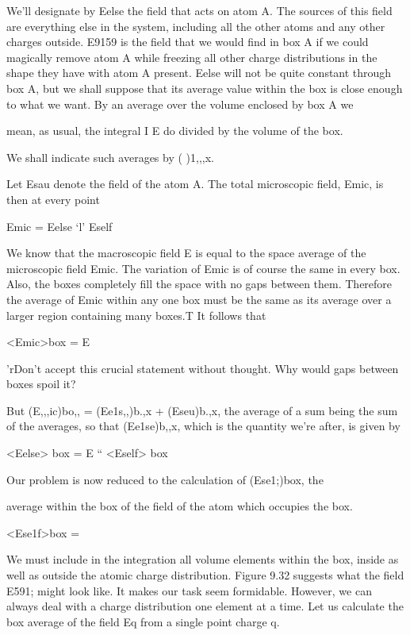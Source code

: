 {{We'll designate by Eelse the field that acts on atom A. The sources
of this field are everything else in the system, including all the other
atoms and any other charges outside. E9159 is the field that we would
find in box A if we could magically remove atom A while freezing all
other charge distributions in the shape they have with atom A
present. Eelse will not be quite constant through box A, but we shall
suppose that its average value within the box is close enough to what
we want. By an average over the volume enclosed by box A we

mean, as usual, the integral I E do divided by the volume of the box.

We shall indicate such averages by ( )1,,,x.

Let Esau denote the field of the atom A. The total microscopic
field, Emic, is then at every point

Emic = Eelse ‘l' Eself 

We know that the macroscopic field E is equal to the space average
of the microscopic field Emic. The variation of Emic is of course the
same in every box. Also, the boxes completely fill the space with
no gaps between them. Therefore the average of Emic within any
one box must be the same as its average over a larger region containing
many boxes.T It follows that

<Emic>box = E 

'rDon't accept this crucial statement without thought. Why would gaps between
boxes spoil it?

But (E,,,ic)bo,, = (Ee1s,,)b.,x + (Eseu)b.,x, the average of a sum being
the sum of the averages, so that (Ee1se)b,,x, which is the quantity we're
after, is given by

\begin{equation}
\end{equation}
<Eelse> box = E `` <Eself> box 

Our problem is now reduced to the calculation of (Ese1;)box, the

average within the box of the field of the atom which occupies the
box.

\begin{equation}
\end{equation}
<Ese1f>box = %

We must include in the integration all volume elements within the
box, inside as well as outside the atomic charge distribution. Figure
9.32 suggests what the field E591; might look like. It makes our task
seem formidable. However, we can always deal with a charge distribution
one element at a time. Let us calculate the box average
of the field Eq from a single point charge q.

}}
